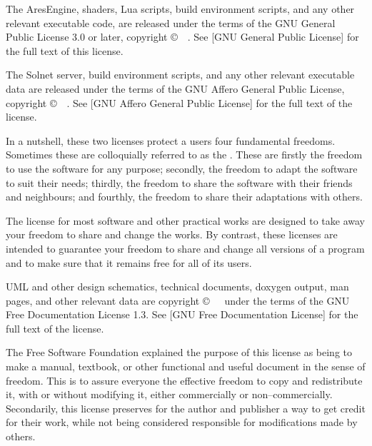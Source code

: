 
The AresEngine, shaders, Lua scripts, build environment scripts, and any other relevant executable code, are released under the terms of the GNU General Public License 3.0 or later, copyright \copyright\ \CopyrightDates\ \CopyrightHolder. See [GNU General Public License] for the full text of this license.

The Solnet server, build environment scripts, and any other relevant executable data are released under the terms of the GNU Affero General Public License, copyright \copyright\ \CopyrightDates\ \CopyrightHolder. See [GNU Affero General Public License] for the full text of the license.

In a nutshell, these two licenses protect a users four fundamental freedoms. Sometimes these are colloquially referred to as the . These are firstly the freedom to use the software for any purpose; secondly, the freedom to adapt the software to suit their needs; thirdly, the freedom to share the software with their friends and neighbours; and fourthly, the freedom to share their adaptations with others. 

The license for most software and other practical works are designed to take away your freedom to share and change the works. By contrast, these licenses are intended to guarantee your freedom to share and change all versions of a program and to make sure that it remains free for all of its users.


UML and other design schematics, technical documents, doxygen output, man pages, and other relevant data are copyright \copyright\ \CopyrightDates\ \CopyrightHolder\ under the terms of the GNU Free Documentation License 1.3. See [GNU Free Documentation License] for the full text of the license.

The Free Software Foundation explained the purpose of this license as being to make a manual, textbook, or other functional and useful document  in the sense of freedom. This is to assure everyone the effective freedom to copy and redistribute it, with or without modifying it, either commercially or non--commercially. Secondarily, this license preserves for the author and publisher a way to get credit for their work, while not being considered responsible for modifications made by others.


